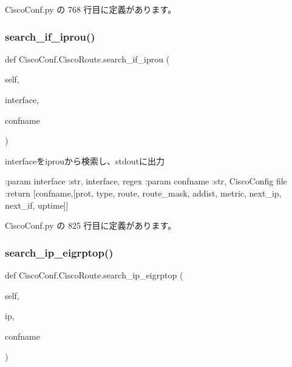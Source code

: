  Cisco\+Conf.\+py の 768 行目に定義があります。

\mbox{\label{classCiscoConf_1_1CiscoRoute_abd83b9c4cb4ddaf2a35f2e750f390eb0}} 
\subsubsection{\texorpdfstring{search\_if\_iprou()}{search\_if\_iprou()}}
{\footnotesize\ttfamily def Cisco\+Conf.\+Cisco\+Route.\+search\+\_\+if\+\_\+iprou (\begin{DoxyParamCaption}\item[{}]{self,  }\item[{}]{interface,  }\item[{}]{confname }\end{DoxyParamCaption})}

\begin{DoxyVerb}interfaceをiprouから検索し、stdoutに出力

:param  interface :str, interface, regex
:param  confname  :str, CiscoConfig file
:return [confname,[prot, type, route, route_mask, addist, metric, next_ip, next_if, uptime]]
\end{DoxyVerb}
 

 Cisco\+Conf.\+py の 825 行目に定義があります。

\mbox{\label{classCiscoConf_1_1CiscoRoute_a73d916cf6fe50d2483adf1832ae99400}} 
\subsubsection{\texorpdfstring{search\_ip\_eigrptop()}{search\_ip\_eigrptop()}}
{\footnotesize\ttfamily def Cisco\+Conf.\+Cisco\+Route.\+search\+\_\+ip\+\_\+eigrptop (\begin{DoxyParamCaption}\item[{}]{self,  }\item[{}]{ip,  }\item[{}]{confname }\end{DoxyParamCaption})}

